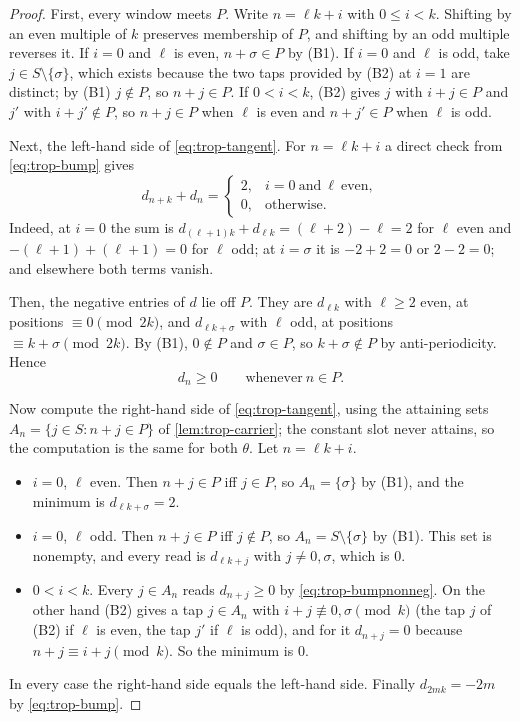 \begin{proof}
First, every window meets $P$. Write
$n=\ell k+i$ with $0\le i<k$. Shifting by an even multiple of $k$ preserves
membership of $P$, and shifting by an odd multiple reverses it. If $i=0$ and $\ell$
is even, $n+\sigma\in P$ by (B1). If $i=0$ and $\ell$ is odd, take $j\in S\setminus\{\sigma\}$,
which exists because the two taps provided by (B2) at $i=1$ are distinct; by (B1)
$j\notin P$, so $n+j\in P$. If $0<i<k$, (B2) gives $j$ with $i+j\in P$ and $j'$ with
$i+j'\notin P$, so $n+j\in P$ when $\ell$ is even and $n+j'\in P$ when $\ell$ is odd.

Next, the left-hand side of \eqref{eq:trop-tangent}. For $n=\ell k+i$ a direct check
from \eqref{eq:trop-bump} gives
\[
d_{n+k}+d_n=\begin{cases}2,&i=0\ \text{and}\ \ell\ \text{even},\\0,&\text{otherwise}.
\end{cases}
\]
Indeed, at $i=0$ the sum is $d_{(\ell+1)k}+d_{\ell k}=(\ell+2)-\ell=2$ for $\ell$ even and
$-(\ell+1)+(\ell+1)=0$ for $\ell$ odd; at $i=\sigma$ it is $-2+2=0$ or $2-2=0$; and
elsewhere both terms vanish.

Then, the negative entries of $d$ lie off $P$. They are $d_{\ell k}$ with $\ell\ge2$
even, at positions $\equiv0\pmod{2k}$, and $d_{\ell k+\sigma}$ with $\ell$ odd, at
positions $\equiv k+\sigma\pmod{2k}$. By (B1), $0\notin P$ and $\sigma\in P$, so
$k+\sigma\notin P$ by anti-periodicity. Hence
\begin{equation}
d_n\ge0\qquad\text{whenever}\ n\in P.
\label{eq:trop-bumpnonneg}
\end{equation}

Now compute the right-hand side of \eqref{eq:trop-tangent}, using the attaining
sets $A_n=\{j\in S:n+j\in P\}$ of \autoref{lem:trop-carrier}; the constant slot
never attains, so the computation is the same for both $\theta$. Let $n=\ell k+i$.
\begin{itemize}
\item $i=0$, $\ell$ even. Then $n+j\in P$ iff $j\in P$, so $A_n=\{\sigma\}$ by (B1),
and the minimum is $d_{\ell k+\sigma}=2$.
\item $i=0$, $\ell$ odd. Then $n+j\in P$ iff $j\notin P$, so $A_n=S\setminus\{\sigma\}$
by (B1). This set is nonempty, and every read is $d_{\ell k+j}$ with $j\ne0,\sigma$,
which is $0$.
\item $0<i<k$. Every $j\in A_n$ reads $d_{n+j}\ge0$ by \eqref{eq:trop-bumpnonneg}.
On the other hand (B2) gives a tap $j\in A_n$ with $i+j\not\equiv0,\sigma\pmod k$
(the tap $j$ of (B2) if $\ell$ is even, the tap $j'$ if $\ell$ is odd), and for it
$d_{n+j}=0$ because $n+j\equiv i+j\pmod k$. So the minimum is $0$.
\end{itemize}
In every case the right-hand side equals the left-hand side. Finally
$d_{2mk}=-2m$ by \eqref{eq:trop-bump}.
\end{proof}

